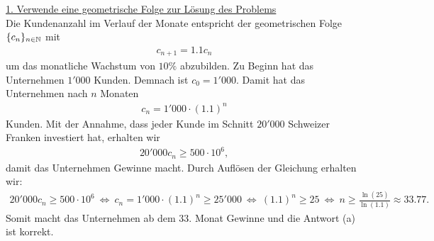 \underline{1. Verwende eine geometrische Folge zur Lösung des Problems}\\
Die Kundenanzahl im Verlauf der Monate entspricht der geometrischen Folge $\{ c_n \}_{n \in \mathbb{N}}$ mit 
\begin{align*}
	c_{n+1} = 1.1 c_n
\end{align*} 
um das monatliche Wachstum von $10 \%$ abzubilden. Zu Beginn hat das Unternehmen $1'000$ Kunden. Demnach ist $c_0 = 1'000$. Damit hat das Unternehmen nach $n$ Monaten
\begin{align*}
	c_n =  1'000 \cdot (1.1)^n
\end{align*}
Kunden. Mit der Annahme, dass jeder Kunde im Schnitt $20'000 $ Schweizer Franken investiert hat, erhalten wir
\begin{align*}
	20'000 c_n \geq 500 \cdot 10^6,
\end{align*}
damit das Unternehmen Gewinne macht. Durch Auflösen der Gleichung erhalten wir:
\begin{align*}
	20'000 c_n \geq 500 \cdot 10^6
	\ \Leftrightarrow \
	c_n = 1'000 \cdot (1.1)^n \geq 25'000
	\ \Leftrightarrow \
	(1.1)^n \geq 25
	\ \Leftrightarrow \
	n \geq \frac{\ln(25)}{\ln(1.1)}
	\approx
	33.77.
\end{align*}
Somit macht das Unternehmen ab dem $33$. Monat Gewinne und die Antwort (a) ist korrekt.


\newpage

